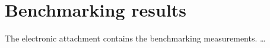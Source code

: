 \chapter{Benchmarking results}\label{app:data}

The electronic attachment contains the benchmarking measurements. \ldots
